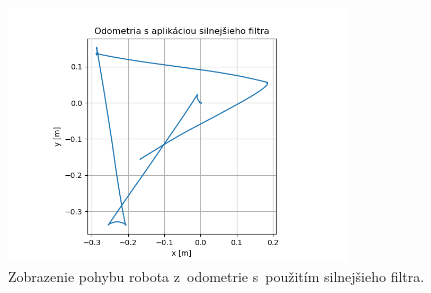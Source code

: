 \begin{figure}[!htbp]
	\begin{center}
		\includegraphics[width=0.8\textwidth]{img/stvorec_so_silnym_filtrom.png}
	\end{center}
	\caption{Zobrazenie pohybu robota z~odometrie s~použitím silnejšieho filtra.}
	\label{fig:stvorecSoSilnymFiltrom}
\end{figure}

